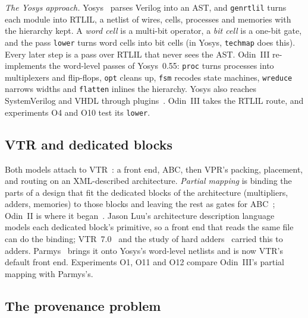 \documentclass[conference]{IEEEtran}
\newcommand{\code}[1]{\texttt{#1}}
\begin{document}
\emph{The Yosys approach.} Yosys~\cite{wolf2013yosys} parses Verilog into an AST, and \code{genrtlil} turns each module into RTLIL, a netlist of wires, cells, processes and memories with the hierarchy kept. A \emph{word cell} is a multi-bit operator, a \emph{bit cell} is a one-bit gate, and the pass \code{lower} turns word cells into bit cells (in Yosys, \code{techmap} does this). %
Every later step is a pass over RTLIL that never sees the AST. Odin~III re-implements the word-level passes of Yosys~0.55: \code{proc} turns processes into multiplexers and flip-flops, \code{opt} cleans up, \code{fsm} recodes state machines, \code{wreduce} narrows widths and \code{flatten} inlines the hierarchy. %
Yosys also reaches SystemVerilog and VHDL through plugins~\cite{yosysslang,ghdl}. Odin~III takes the RTLIL route, and experiments O4 and O10 test its \code{lower}.

\subsection{VTR and dedicated blocks}

Both models attach to VTR~\cite{luu2009vpr5,rose2012vtr,luu2014vtr7,murray2020vtr8}: a front end, ABC, then VPR's packing, placement, and routing on an XML-described architecture. \emph{Partial mapping} is binding the parts of a design that fit the dedicated blocks of the architecture (multipliers, adders, memories) to those blocks and leaving the rest as gates for ABC~\cite{jamiesonthesis}; Odin~II is where it began~\cite{jamieson2011odin2}. %
Jason Luu's architecture description language~\cite{luu2011packing} models each dedicated block's primitive, so a front end that reads the same file can do the binding; VTR~7.0~\cite{luu2014vtr7} and the study of hard adders~\cite{luu2014hardadders} carried this to adders. Parmys~\cite{parmys} brings it onto Yosys's word-level netlists and is now VTR's default front end. Experiments O1, O11 and O12 compare Odin~III's partial mapping with Parmys's.

\subsection{The provenance problem}
\label{sec:provenance-problem}
\end{document}
